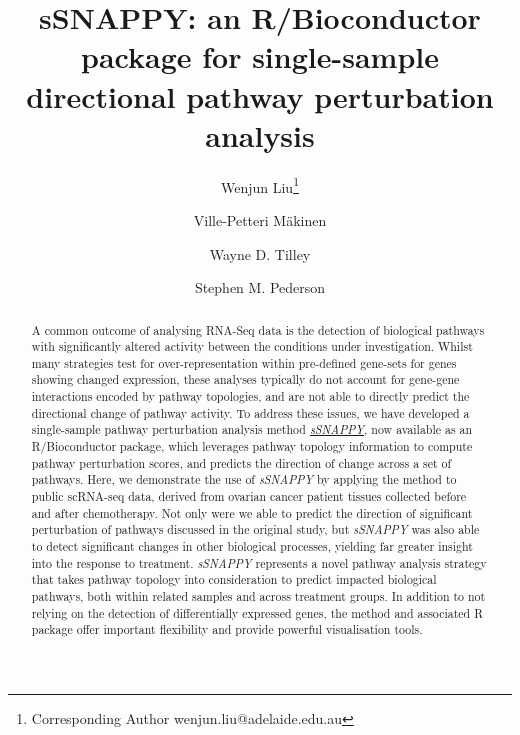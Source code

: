 \documentclass[9pt,a4paper,]{extarticle}
\begin{document}
\pagestyle{front}

\title{sSNAPPY: an R/Bioconductor package for single-sample directional pathway perturbation analysis}

\author[1]{Wenjun Liu\thanks{\ttfamily Corresponding Author wenjun.liu@adelaide.edu.au}}
\author[2,3]{Ville-Petteri Mäkinen}
\author[1]{Wayne D. Tilley}
\author[1,4,5]{Stephen M. Pederson}

\maketitle
\thispagestyle{front}

\begin{abstract}
A common outcome of analysing RNA-Seq data is the detection of biological pathways with significantly altered activity between the conditions under investigation. Whilst many strategies test for over-representation within pre-defined gene-sets for genes showing changed expression, these analyses typically do not account for gene-gene interactions encoded by pathway topologies, and are not able to directly predict the directional change of pathway activity. To address these issues, we have developed a single-sample pathway perturbation analysis method \href{https://bioconductor.org/packages/sSNAPPY}{\emph{sSNAPPY}}, now available as an R/Bioconductor package, which leverages pathway topology information to compute pathway perturbation scores, and predicts the direction of change across a set of pathways. Here, we demonstrate the use of \emph{sSNAPPY} by applying the method to public scRNA-seq data, derived from ovarian cancer patient tissues collected before and after chemotherapy. Not only were we able to predict the direction of significant perturbation of pathways discussed in the original study, but \emph{sSNAPPY} was also able to detect significant changes in other biological processes, yielding far greater insight into the response to treatment. \emph{sSNAPPY} represents a novel pathway analysis strategy that takes pathway topology into consideration to predict impacted biological pathways, both within related samples and across treatment groups. In addition to not relying on the detection of differentially expressed genes, the method and associated R package offer important flexibility and provide powerful visualisation tools.
\end{abstract}
\end{document}
